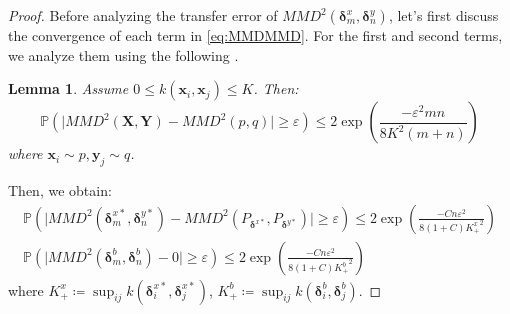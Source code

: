 \documentclass{article}
\newtheorem{lemma}{Lemma}[section]
\begin{document}
\begin{proof}
Before analyzing the transfer error of $MMD^2\left(\bm{\delta}_m^x, \bm{\delta}_n^y\right)$, let's first discuss the convergence of each term in \eqref{eq:MMDMMD}.
For the first and second terms, we analyze them using the following  \cite{gretton2012kernel}.
\begin{lemma}\label{le:MMDcon}
    Assume $0 \leq k(\bm{x}_i, \bm{x}_j) \leq K $. Then:
    \begin{equation}
        \mathbb{P}\left(\big|MMD^2(\bm{X}, \bm{Y}) - MMD^2(p, q)\big| \geq \varepsilon \right) \leq 2\exp\left(\frac{-\varepsilon^2mn}{8K^2(m+n)}\right)
    \end{equation}
    where $\bm{x}_i \sim p, \bm{y}_j \sim q$.
\end{lemma}
Then, we obtain:
\begin{equation}\label{eq:1st2nd}
    \begin{gathered}
        \mathbb{P}\left(\big|MMD^2(\bm{\delta}_m^{x*}, \bm{\delta}_n^{y*}) - MMD^2(P_{\bm{\delta}^{x*}}, P_{\bm{\delta}^{y*}}) \big| \geq \varepsilon \right) \leq 2\exp\left(\frac{-Cn\varepsilon^2}{8(1+C){K_+^x}^2}\right) \\
        \mathbb{P}\left(\big|MMD^2(\bm{\delta}_m^{b}, \bm{\delta}_n^{b}) - 0 \big| \geq \varepsilon \right) \leq 2\exp\left(\frac{-Cn\varepsilon^2}{8(1+C){K_+^b}^2}\right)
    \end{gathered}
\end{equation}
where $K_+^x \coloneqq \sup_{ij} k(\bm{\delta}_i^{x*}, \bm{\delta}_j^{x*})$, $K_+^b \coloneqq \sup_{ij} k(\bm{\delta}_i^{b}, \bm{\delta}_j^{b})$.


\end{proof}
\end{document}
